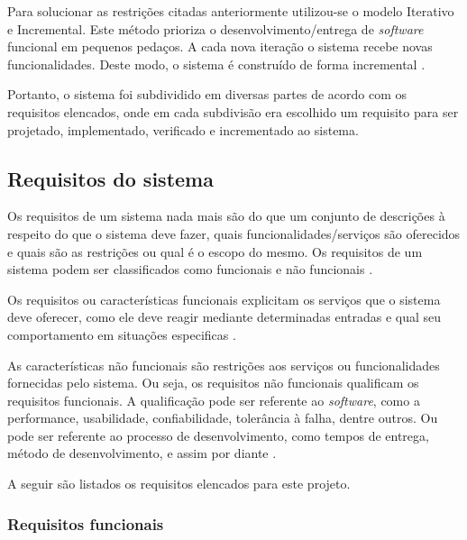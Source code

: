 Para solucionar as restrições citadas anteriormente utilizou-se o modelo Iterativo e Incremental. Este método prioriza o desenvolvimento/entrega de \textit{software} funcional em pequenos pedaços. A cada nova iteração o sistema recebe novas funcionalidades. Deste modo, o sistema é construído de forma incremental \cite{SITEINTERATIVOINCREMENTAL}.

Portanto, o sistema foi subdividido em diversas partes de acordo com os requisitos elencados, onde em cada subdivisão era escolhido um requisito para ser projetado, implementado, verificado e incrementado ao sistema.

\subsection{Requisitos do sistema} \label{subsec:requisitos}

Os requisitos de um sistema nada mais são do que um conjunto de descrições à respeito do que o sistema deve fazer, quais funcionalidades/serviços são oferecidos e quais são as restrições ou qual é o escopo do mesmo. Os requisitos de um sistema podem ser classificados como funcionais e não funcionais \cite{sommerville2011engenharia}.

Os requisitos ou características funcionais explicitam os serviços que o sistema deve oferecer, como ele deve reagir mediante determinadas entradas e qual seu comportamento em situações especificas \cite{sommerville2011engenharia, engsoftwilson}.

As características não funcionais são restrições aos serviços ou funcionalidades fornecidas pelo sistema. Ou seja, os requisitos não funcionais qualificam os requisitos funcionais. A qualificação pode ser referente ao \textit{software}, como a performance, usabilidade, confiabilidade, tolerância à falha, dentre outros. Ou pode ser referente ao processo de desenvolvimento, como tempos de entrega, método de desenvolvimento, e assim por diante \cite{introrequisitos}.

A seguir são listados os requisitos elencados para este projeto.


\subsubsection{Requisitos funcionais}

